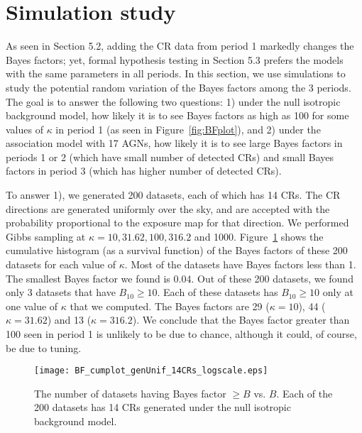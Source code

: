 \section{Simulation study}\label{sec:simulations}

As seen in Section 5.2, adding the CR data from period 1 markedly changes
the Bayes factors; yet, formal hypothesis testing in Section 5.3 prefers the models
with the same parameters in all periods. In this section, we use simulations to  study the potential random variation of the Bayes factors among the 3 periods. The goal is to
answer the following two questions: 1) under the null isotropic background model,
how likely it is to see Bayes factors as high as 100  for some values of $\kappa$ in period 1 (as seen in Figure~\ref{fig:BFplot}),
and 2) under the association model with 17 AGNs, how likely it is to see large Bayes factors
in periods 1 or 2 (which have small number of detected CRs) and small Bayes factors in
period 3 (which has higher number of detected CRs).

To answer 1), we generated 200 datasets, each of which has 14 CRs. The CR directions are
generated uniformly over the sky, and are accepted with the probability proportional
to the exposure map for that direction. We performed Gibbs sampling at $\kappa
= 10, 31.62, 100, 316.2$ and 1000. Figure~\ref{fig:unifCumBF} shows the cumulative histogram (as a survival function) of the
Bayes factors of these 200 datasets for each value of $\kappa$.
Most of the datasets have Bayes factors less than 1. The smallest Bayes factor
we found is 0.04. Out of these 200 datasets, we found only 3 datasets
that have $B_{10}\geq10$. Each of these datasets has $B_{10}\geq10$ only at one value
of $\kappa$ that we computed. The Bayes factors are 29 ($\kappa=10$), 44 ($\kappa = 31.62$)
and 13 ($\kappa = 316.2$).
We conclude that the Bayes factor greater than 100 seen in period 1 is unlikely to be due to chance, although it could, of course, be due to tuning.

\begin{figure}
\centerline{\texttt{[image: BF\_cumplot\_genUnif\_14CRs\_logscale.eps]} }
\caption{The number of datasets having Bayes factor $\geq B$ vs. $B$. Each of the 200 datasets has
14 CRs generated under the null isotropic background model.}
\label{fig:unifCumBF}
\end{figure}

